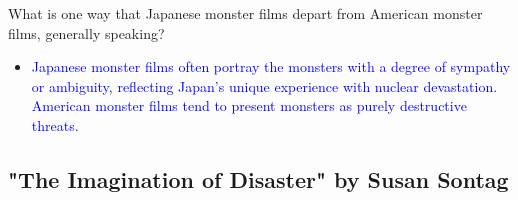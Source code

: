 \documentclass[11pt,fleqn]{book} %
\begin{document}
\begin{exercise}
What is one way that Japanese monster films depart from American monster films, generally speaking?
\begin{itemize}
\item \textcolor{blue}{Japanese monster films often portray the monsters with a degree of sympathy or ambiguity, reflecting Japan's unique experience with nuclear devastation. American monster films tend to present monsters as purely destructive threats.}
\end{itemize}
\end{exercise}

\subsection*{"The Imagination of Disaster" by Susan Sontag}
\end{document}
